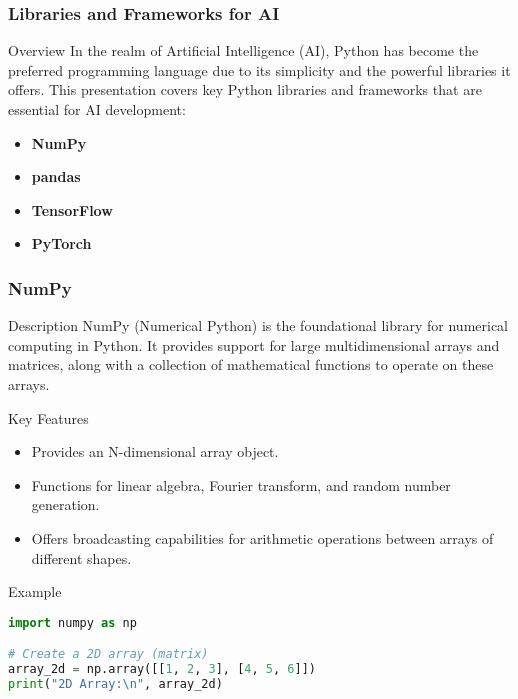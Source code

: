 \documentclass[aspectratio=169]{beamer}
\begin{document}
\begin{frame}
    \frametitle{Libraries and Frameworks for AI}
    \begin{block}{Overview}
        In the realm of Artificial Intelligence (AI), Python has become the preferred programming language due to its simplicity and the powerful libraries it offers. This presentation covers key Python libraries and frameworks that are essential for AI development:
        \begin{itemize}
            \item \textbf{NumPy}
            \item \textbf{pandas}
            \item \textbf{TensorFlow}
            \item \textbf{PyTorch}
        \end{itemize}
    \end{block}
\end{frame}

\begin{frame}[fragile]
    \frametitle{NumPy}
    \begin{block}{Description}
        NumPy (Numerical Python) is the foundational library for numerical computing in Python. It provides support for large multidimensional arrays and matrices, along with a collection of mathematical functions to operate on these arrays.
    \end{block}
    \begin{block}{Key Features}
        \begin{itemize}
            \item Provides an N-dimensional array object.
            \item Functions for linear algebra, Fourier transform, and random number generation.
            \item Offers broadcasting capabilities for arithmetic operations between arrays of different shapes.
        \end{itemize}
    \end{block}
    \begin{block}{Example}
        \begin{lstlisting}[language=Python]
import numpy as np

# Create a 2D array (matrix)
array_2d = np.array([[1, 2, 3], [4, 5, 6]])
print("2D Array:\n", array_2d)
        \end{lstlisting}
    \end{block}
\end{frame}
\end{document}
